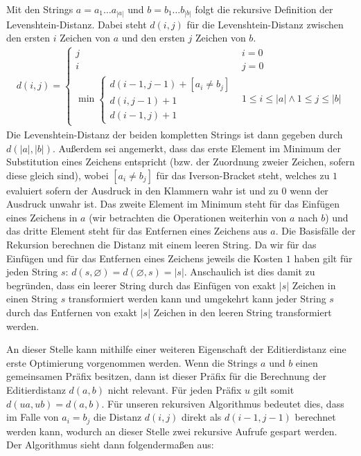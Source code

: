 \documentclass{whswinvcbook}
\begin{document}
Mit den Strings $a=a_1\dots a_{|a|}$ und $b=b_1\dots b_{|b|}$ folgt die rekursive Definition der Levenshtein-Distanz. Dabei steht $d(i,j)$ für die Levenshtein-Distanz zwischen den ersten $i$ Zeichen von $a$ und den ersten $j$ Zeichen von $b$.
\begin{align}
    d(i,j)=\begin{cases}
        j & i=0\\
        i & j=0\\
        \min\begin{cases}
            d(i-1,j-1)+[a_i\neq b_j]\\
            d(i,j-1)+1\\
            d(i-1,j)+1
        \end{cases} & 1\leq i\leq |a| \wedge 1\leq j\leq |b|
    \end{cases}
\end{align}
Die Levenshtein-Distanz der beiden kompletten Strings ist dann gegeben durch $d(|a|,|b|)$. Außerdem sei angemerkt, dass das erste Element im Minimum der Substitution eines Zeichens entspricht (bzw. der Zuordnung zweier Zeichen, sofern diese gleich sind), wobei $[a_i\neq b_j]$ für das Iverson-Bracket steht, welches zu $1$ evaluiert sofern der Ausdruck in den Klammern wahr ist und zu $0$ wenn der Ausdruck unwahr ist. Das zweite Element im Minimum steht für das Einfügen eines Zeichens in $a$ (wir betrachten die Operationen weiterhin von $a$ nach $b$) und das dritte Element steht für das Entfernen eines Zeichens aus $a$. Die Basisfälle der Rekursion berechnen die Distanz mit einem leeren String. Da wir für das Einfügen und für das Entfernen eines Zeichens jeweils die Kosten $1$ haben gilt für jeden String $s$: $d(s,\varnothing)=d(\varnothing,s)=|s|$. Anschaulich ist dies damit zu begründen, dass ein leerer String durch das Einfügen von exakt $|s|$ Zeichen in einen String $s$ transformiert werden kann und umgekehrt kann jeder String $s$ durch das Entfernen von exakt $|s|$ Zeichen in den leeren String transformiert werden.

An dieser Stelle kann mithilfe einer weiteren Eigenschaft der Editierdistanz eine erste Optimierung vorgenommen werden. Wenn die Strings $a$ und $b$ einen gemeinsamen Präfix besitzen, dann ist dieser Präfix für die Berechnung der Editierdistanz $d(a,b)$ nicht relevant. Für jeden Präfix $u$ gilt somit $d(ua,ub)=d(a,b)$. Für unseren rekursiven Algorithmus bedeutet dies, dass im Falle von $a_i=b_j$ die Distanz $d(i,j)$ direkt als $d(i-1,j-1)$ berechnet werden kann, wodurch an dieser Stelle zwei rekursive Aufrufe gespart werden. Der Algorithmus sieht dann folgendermaßen aus:
\end{document}
